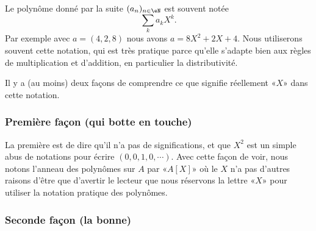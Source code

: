Le polynôme donné par la suite \( (a_n)_{n\in \eN}\) est souvent notée
\begin{equation}
	\sum_ka_kX^k.
\end{equation}
Par exemple avec \( a=(4,2,8)\) nous avons \( a=8X^2+2X+4\). Nous utiliserons souvent cette notation, qui est très pratique parce qu'elle s'adapte bien aux règles de multiplication et d'addition, en particulier la distributivité.

Il y a (au moins) deux façons de comprendre ce que signifie réellement «\( X\)» dans cette notation.

\subsubsection{Première façon (qui botte en touche)}

La première est de dire qu'il n'a pas de significations, et que \( X^2\) est un simple abus de notations pour écrire \( (0,0,1,0,\cdots)\). Avec cette façon de voir, nous notons l'anneau des polynômes sur \( A\) par «\( A[X]\)» où le \( X\) n'a pas d'autres raisons d'être que d'avertir le lecteur que nous réservons la lettre «\( X\)» pour utiliser la notation pratique des polynômes.

\subsubsection{Seconde façon (la bonne)}
\label{SUBSUBSECooPNBYooWXEHrg}

